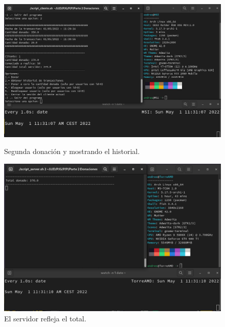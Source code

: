 \documentclass{article}
\begin{document}
\begin{figure}[H]
    \centering
    \begin{minipage}[H]{0.45\textwidth}
        \centering
        \includegraphics[width=\textwidth]{imagenes/multiples ordenadores/Cliente/Screenshot from 2022-05-01 11-31-13.png}
        \caption{Segunda donación y mostrando el historial.}
    \end{minipage}
    \hfill
    \begin{minipage}[H]{0.45\textwidth}
        \centering
        \includegraphics[width=\textwidth]{imagenes/multiples ordenadores/Servidor/Screenshot from 2022-05-01 11-31-13.png}
        \caption{El servidor refleja el total.}
    \end{minipage}
\end{figure}
\end{document}
